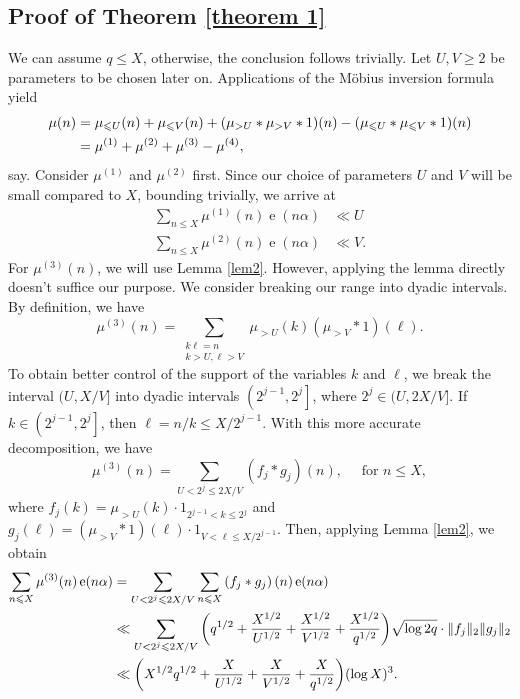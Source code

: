 \documentclass[11pt]{amsart}
\numberwithin{equation}{section}
\numberwithin{figure}{section}
\theoremstyle{definition}
\newcommand{\e}{\operatorname{e}}
\begin{document}
\subsection{Proof of Theorem \ref{theorem 1}} We can assume $q \leqslant X$, otherwise, the conclusion follows trivially. Let $U, V \geqslant 2$ be parameters to be chosen later on. Applications of the Möbius inversion formula yield
\begin{align}\label{Mobius : Step 2}
 \mu(n) &= \mu_{\leqslant U}(n) + \mu_{\leqslant V}(n)+  (\mu_{>U}*\mu_{>V}*1)(n) -(\mu_{\leqslant U}*\mu_{\leqslant V}*1)(n) \notag \\
 & = \mu^{(1)} + \mu^{(2)}+\mu^{(3)}-\mu^{(4)},
\end{align}
say. Consider $\mu^{(1)}$ and $\mu^{(2)}$ first. Since our choice of parameters $U$ and $V$ will be small compared to $X$, bounding trivially, we arrive at
\begin{align}%
\sum_{n\leqslant X }\mu^{(1)}(n)\e(n\alpha)&\ll U \label{mu-1 sum} \\
     \sum_{n\leqslant X }\mu^{(2)}(n)\e(n\alpha)& \ll V \label{mu-2 sum}.
\end{align}
For $\mu^{(3)}(n)$, we will use Lemma \ref{lem2}. However, applying the lemma directly doesn't suffice our purpose. We consider breaking our range into dyadic intervals. By definition, we have
$$
\mu^{(3)}(n)=\sum_{\substack{k \ell=n \\ k>U, \ell >V}} \mu_{>U}(k) (\mu_{>V} * 1)(\ell) .
$$
To obtain better control of the support of the variables $k$ and $\ell$, we break the interval $(U, X/ V]$ into dyadic intervals $\left(2^{j-1}, 2^j\right]$, where $2^j \in(U, 2 X / V]$. If $k \in\left(2^{j-1}, 2^j\right]$, then $\ell=n / k \leqslant X / 2^{j-1}$. With this more accurate decomposition, we have
$$
\mu^{(3)}(n)=\sum_{U<2^j \leqslant 2 X / V}\left(f_j * g_j\right)(n), \quad \text { for } n \leqslant X ,
$$
where $f_j(k)=\mu_{>U}(k) \cdot 1_{2^{j-1}<k \leqslant 2^j}$ and $g_j(\ell)=(\mu_{>V} * 1)(\ell) \cdot 1_{V<\ell \leqslant X/ 2^{j-1}}$. Then, applying Lemma \ref{lem2}, we obtain 
\begin{align}\label{mu-3 sum}
    \sum_{n\leqslant X }\mu^{(3)}(n)\e(n\alpha) &= \sum_{U<2^j \leqslant 2 X / V} \sum_{n\leqslant X }\left(f_j * g_j\right)(n)\e(n\alpha) \notag \\
    &\ll \sum_{U<2^j \leqslant 2 X / V} \bigg(q^{1/2} + \dfrac{X^{1/2}}{U^{1/2}} +\dfrac{X^{1/2}}{V^{1/2}} + \dfrac{X^{1/2}}{q^{1/2}}\bigg)\sqrt{\log 2q}\cdot \|f_j\|_2\|g_j\|_2 \notag \\
    &\ll \bigg(X^{1/2}q^{1/2} + \dfrac{X}{U^{1/2}} +\dfrac{X}{V^{1/2}}+ \dfrac{X}{q^{1/2}}\bigg)(\log X)^3.
\end{align}
\end{document}
